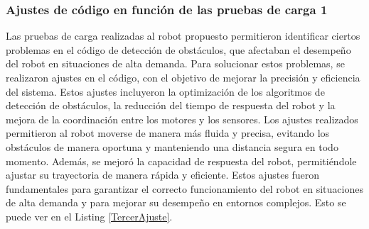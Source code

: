 \subsubsection{Ajustes de c\'odigo en funci\'on de las pruebas de carga 1} %
    \label{sub:Ajustes de c\'odigo en funci\'on de las pruebas de carga}
        Las pruebas de carga realizadas al robot propuesto permitieron identificar ciertos problemas en el c\'odigo de detecci\'on de obst\'aculos, 
            que afectaban el desempe\~no del robot en situaciones de alta demanda. Para solucionar estos problemas, se realizaron ajustes en el c\'odigo, 
            con el objetivo de mejorar la precisi\'on y eficiencia del sistema. Estos ajustes incluyeron la optimizaci\'on de los algoritmos de detecci\'on 
            de obst\'aculos, la reducci\'on del tiempo de respuesta del robot y la mejora de la coordinaci\'on entre los motores y los sensores. 
        \vskip 0.5cm
        Los ajustes realizados permitieron al robot moverse de manera m\'as fluida y precisa, evitando los obst\'aculos de manera oportuna y manteniendo 
            una distancia segura en todo momento. Adem\'as, se mejor\'o la capacidad de respuesta del robot, permiti\'endole ajustar su trayectoria 
            de manera r\'apida y eficiente. Estos ajustes fueron fundamentales para garantizar el correcto funcionamiento del robot en situaciones 
            de alta demanda y para mejorar su desempe\~no en entornos complejos. Esto se puede ver en el Listing \ref{TercerAjuste}.
